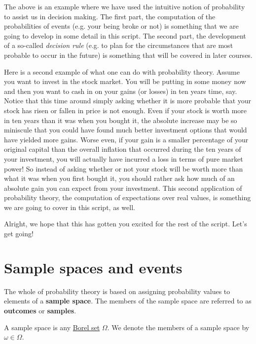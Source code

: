\documentclass[a4paper,11pt,leqno]{report}
\begin{document}
The above is an example where we have used the intuitive notion of probability to assist us in decision
making. The first part, the computation of the probabilities of events (e.g. your being broke or not)
is something that we are going to develop in some detail in this script. The second part, the development
of a so-called \textit{decision rule} (e.g. to plan for the circumstances that are most probable to 
occur in the future) is something that will be covered in later courses.

Here is a second example of what one can do with probability theory. Assume you want to invest in the 
stock market. You will be putting in some money now and then you want to cash in on your gains (or losses)
in ten years time, say. Notice that this time around simply asking whether it is more probable that your
stock has risen or fallen in price is not enough. Even if your stock is worth more in ten years than it
was when you bought it, the absolute increase may be so miniscule that you could have found much better
investment options that would have yielded more gains. Worse even, if your gain is a smaller percentage
of your original capital than the overall inflation that occurred during the ten years of your investment,
you will actually have incurred a loss in terms of pure market power! So instead of asking whether
or not your stock will be worth more than what it was when you first bought it, you should rather
ask how much of an absolute gain you can expect from your investment. This second application of probability
theory, the computation of expectations over real values, is something we are going to cover in this
script, as well.

Alright, we hope that this has gotten you excited for the rest of the script. Let's get going!

\section{Sample spaces and events}
The whole of probability theory is based on assigning probability values to elements of a 
\textbf{sample space}. The members of the sample space are referred to as \textbf{outcomes} or \textbf{samples}.

\begin{Definition} A sample space is any \href{http://en.wikipedia.org/wiki/Borel_set}{Borel set} 
$ \Omega $. We denote the members of a sample space by $ \omega \in \Omega $.
\end{Definition}
\end{document}
